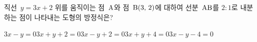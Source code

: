 직선~$y=3x+2$ 위를 움직이는 점~$\mathrm{A}$와 점~$\mathrm{B}(3,\,2)$에 대하여 선분~$\mathrm{AB}$를 $2:1$로 내분하는 점이 나타내는 도형의 방정식은?
\begin{choicesii}{$3x-y=0$}{$3x+y+2=0$}{$3x-y+2=0$}{$3x+y+4=0$}{$3x-y-4=0$}\end{choicesii}

